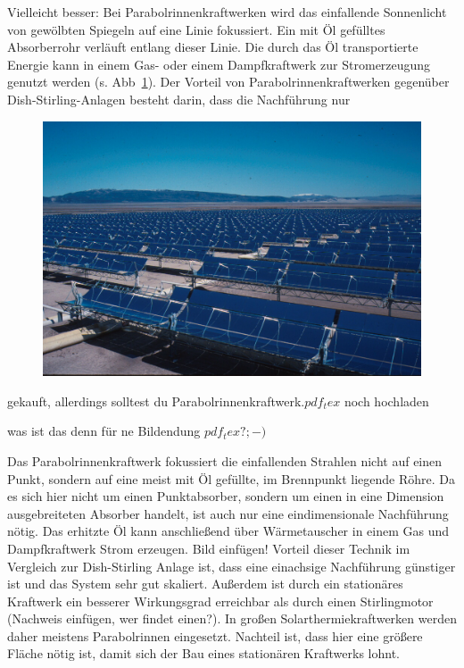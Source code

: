 \documentclass[fontsize=10pt,paper=a4,bibliography=totoc]{scrartcl}
\newcommand{\kai}[1]{{ \color{red} #1 }}
\newcommand{\felix}[1]{{ \color{darkgreen} #1}}
\newcommand{\maxim}[1]{{ \color{blue} #1}}
\begin{document}
\maxim{Vielleicht besser: Bei Parabolrinnenkraftwerken wird das einfallende Sonnenlicht von gewölbten Spiegeln auf eine Linie fokussiert. Ein mit Öl gefülltes Absorberrohr verläuft entlang dieser Linie. Die durch das Öl transportierte Energie kann in einem Gas- oder einem Dampfkraftwerk zur Stromerzeugung genutzt werden (s. Abb~\ref{pic:parabolrinnen}). Der Vorteil von Parabolrinnenkraftwerken gegenüber Dish-Stirling-Anlagen besteht darin, dass die Nachführung nur
\begin{figure}[h]
	\centering
	\def\svgwidth{.6\textwidth}
	\includegraphics[width=\textwidth]{Solar_Plant_kl}%
	
	\label{pic:parabolrinnen}
\end{figure}
}\hfill\newline\newline
\kai{gekauft, allerdings solltest du Parabolrinnenkraftwerk.$pdf_tex$ noch hochladen}

\felix{was ist das denn für ne Bildendung $pdf_tex? ;-)$}

Das Parabolrinnenkraftwerk fokussiert die einfallenden Strahlen nicht auf einen Punkt, sondern auf eine meist mit Öl gefüllte, im Brennpunkt liegende Röhre. Da es sich hier nicht um einen Punktabsorber, sondern um einen in eine Dimension ausgebreiteten Absorber handelt, ist auch nur eine eindimensionale Nachführung nötig. Das erhitzte Öl kann anschließend über Wärmetauscher in einem Gas und Dampfkraftwerk Strom erzeugen. Bild einfügen! Vorteil dieser Technik im Vergleich zur Dish-Stirling Anlage ist, dass eine einachsige Nachführung günstiger ist und das System sehr gut skaliert. Außerdem ist durch ein stationäres Kraftwerk ein besserer Wirkungsgrad erreichbar als durch einen Stirlingmotor
 (Nachweis einfügen, wer findet einen?). In großen Solarthermiekraftwerken werden daher meistens Parabolrinnen eingesetzt. Nachteil ist, dass hier eine größere Fläche nötig ist, damit sich der Bau eines stationären Kraftwerks lohnt.
\end{document}
